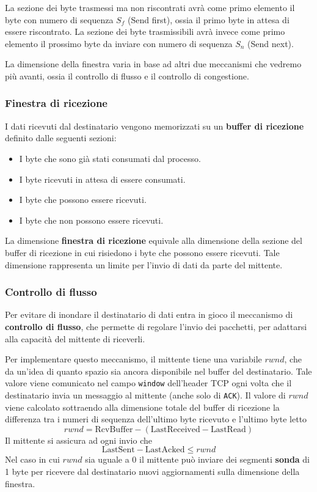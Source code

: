 La sezione dei byte trasmessi ma non riscontrati avrà come primo elemento il byte con numero di
sequenza $S_f$ (Send first), ossia il primo byte in attesa di essere riscontrato. La sezione dei
byte trasmissibili avrà invece come primo elemento il prossimo byte da inviare con numero di 
sequenza $S_n$ (Send next).

La dimensione della finestra varia in base ad altri due meccanismi che vedremo più avanti, ossia
il controllo di flusso e il controllo di congestione.

\subsubsection{Finestra di ricezione}
I dati ricevuti dal destinatario vengono memorizzati su un \textbf{buffer di ricezione} definito
dalle seguenti sezioni:
\begin{itemize}
	\item I byte che sono già stati consumati dal processo.
	\item I byte ricevuti in attesa di essere consumati.
	\item I byte che possono essere ricevuti.
	\item I byte che non possono essere ricevuti.
\end{itemize}
La dimensione \textbf{finestra di ricezione} equivale alla dimensione della sezione del buffer di 
ricezione in cui risiedono i byte che possono essere ricevuti. Tale dimensione rappresenta un
limite per l'invio di dati da parte del mittente.

\subsubsection{Controllo di flusso}
Per evitare di inondare il destinatario di dati entra in gioco il meccanismo di \textbf{controllo
di flusso}, che permette di regolare l'invio dei pacchetti, per adattarsi alla capacità del
mittente di riceverli.

Per implementare questo meccanismo, il mittente tiene una variabile $rwnd$, che da un'idea di
quanto spazio sia ancora disponibile nel buffer del destinatario. Tale valore viene comunicato
nel campo \verb|window| dell'header TCP ogni volta che il destinatario invia un messaggio al
mittente (anche solo di \verb|ACK|). Il valore di $rwnd$ viene calcolato sottraendo alla dimensione
totale del buffer di ricezione la differenza tra i numeri di sequenza dell'ultimo byte ricevuto e 
l'ultimo byte letto
\[ rwnd = \text{RcvBuffer} - (\text{LastReceived} - \text{LastRead}) \]
Il mittente si assicura ad ogni invio che
\[ \text{LastSent} - \text{LastAcked} \leq rwnd \]
Nel caso in cui $rwnd$ sia uguale a 0 il mittente può inviare dei segmenti \textbf{sonda} di 1 byte
per ricevere dal destinatario nuovi aggiornamenti sulla dimensione della finestra.

